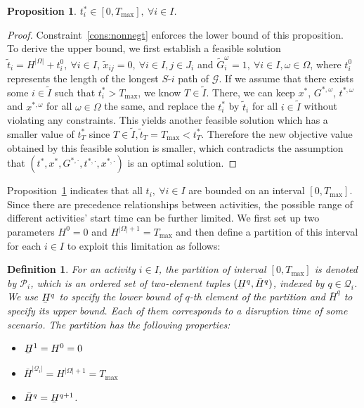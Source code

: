 \documentclass[11pt]{article}
\newtheorem{proposition}[theorem]{Proposition}
\newtheorem{definition}{Definition}
\newcommand{\noi}{\noindent}
\renewcommand{\underbar}{\underaccent{\bar}}
\begin{document}
	\begin{proposition} \label{prop:bounds}
		\(t^*_i \in [0,T_{\max}],\ \forall i \in I\).
	\end{proposition}
	\begin{proof}
		Constraint~\eqref{cons:nonnegt} enforces the lower bound of this proposition. \\
		\newline 
		To derive the upper bound, 
		we first establish a feasible solution \(\tilde{t}_i = H^{|\Omega|} + t^0_i,\ \forall i \in I\), \(\tilde{x}_{ij} = 0,\ \forall i \in I, j \in J_i\) and \(\tilde{G}_i^\omega = 1,\ \forall i \in I, \omega \in \Omega\), where \(t^0_i\) represents the length of the longest \(S\)-\(i\) path of \(\mathcal{G}\). 
		If we assume that there exists some \(i \in \tilde{I}\) such that \(t_i^* > T_{\max}\), we know \(T \in \tilde{I}\). There, we can keep \(x^*\), \(G^{*,\omega}\), \(t^{*,\omega}\) and \(x^{*,\omega}\) for all \(\omega \in \Omega\) the same, and replace the \(t_i^*\) by \(\tilde{t}_i\) for all \(i \in \tilde{I}\) without violating any constraints. This yields another feasible solution which has a smaller value of \(t_T^*\) since \(T \in \tilde{I}, \tilde{t}_T = T_{\max} < t_T^*\). Therefore the new objective value obtained by this feasible solution is smaller, which contradicts the assumption that \((t^*,x^*,G^{*,\cdot},t^{*,\cdot},x^{*,\cdot})\) is an optimal solution.
	\end{proof}
	\noi Proposition~\ref{prop:bounds} indicates that all \(t_i,\ \forall i \in I\) are bounded on an interval \([0,T_{\max}]\). Since there are precedence relationships between activities, the possible range of different activities' start time can be further limited. We first set up two parameters \(H^0 = 0\) and \(H^{|\Omega| + 1} = T_{\max}\) and then define a partition of this interval for each \(i \in I\) to exploit this limitation as follows:
	\begin{definition}
		For an activity \(i \in I\), the partition of interval \([0,T_{\max}]\) is denoted by \(\mathcal{P}_i\), which is an ordered set of two-element tuples %
		\((\underbar{H}^q,\bar{H}^q)\), 
		indexed by \(q \in \mathcal{Q}_i\). We use \(\underbar{H}^q\) to specify the lower bound of \(q\)-th element of the partition and \(\bar{H}^q\) to specify its upper bound. Each of them corresponds to a disruption time of some scenario.
		The partition has the following properties:
		\begin{itemize}
			\item \(\underbar{H}^1 = H^0 = 0\)
			\item \(\bar{H}^{|\mathcal{Q}_i|} = H^{|\Omega| + 1} = T_{\max}\)
			\item \(\bar{H}^q = \underbar{H}^{q + 1}\).
		\end{itemize}
	\end{definition}
\end{document}
